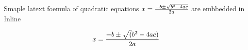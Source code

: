 Smaple latext foemula of quadratic equations $x = {-b \pm \sqrt{b^2-4ac}\over 2a}$ are embbedded in Inline

$$x = {-b \pm \sqrt(b^2-4ac)\over 2a}$$

